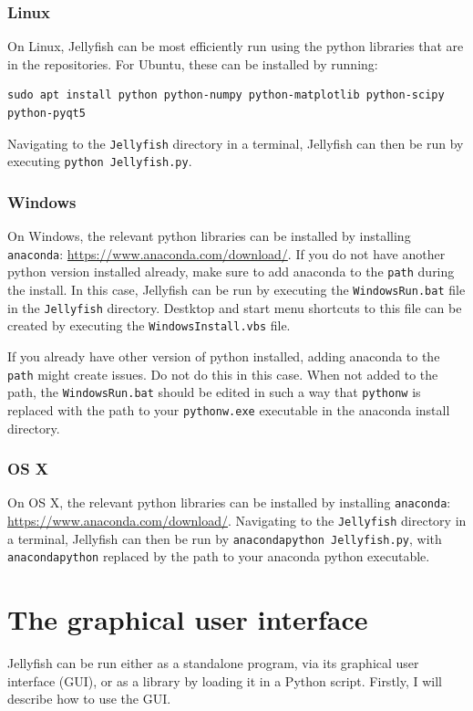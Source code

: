 \documentclass[11pt,a4paper]{article}
\begin{document}
\subsubsection{Linux}
On Linux, Jellyfish can be most efficiently run using the python libraries that are in the
repositories. For Ubuntu, these can be installed by running:
\begin{verbatim}
sudo apt install python python-numpy python-matplotlib python-scipy
python-pyqt5
\end{verbatim}
Navigating to the \texttt{Jellyfish} directory in a terminal, Jellyfish can then be run
by executing \texttt{python Jellyfish.py}.

\subsubsection{Windows}
On Windows, the relevant python libraries can be installed by installing \texttt{anaconda}:
\url{https://www.anaconda.com/download/}. If you do not have another python version installed
already, make sure to add anaconda to the \texttt{path} during the install. In this case, Jellyfish
can be run by executing the \texttt{WindowsRun.bat} file in the \texttt{Jellyfish} directory.
Destktop and start menu shortcuts to this file can be created by executing the
\texttt{WindowsInstall.vbs} file.

If you already have other version of python installed, adding anaconda to the \texttt{path} might
create issues. Do not do this in this case. When not added to the path, the \texttt{WindowsRun.bat}
should be edited in such a way that \texttt{pythonw} is replaced with the path to your
\texttt{pythonw.exe} executable in the anaconda install directory. 

\subsubsection{OS X}
On OS X, the relevant python libraries can be installed by installing \texttt{anaconda}:
\url{https://www.anaconda.com/download/}. Navigating to the \texttt{Jellyfish} directory in a
terminal, Jellyfish can then be run by \texttt{anacondapython Jellyfish.py}, with \texttt{anacondapython}
replaced by the path to your anaconda python executable.

\section{The graphical user interface}
Jellyfish can be run either as a standalone program, via its graphical user interface (GUI), or as a
library by loading it in a Python script. Firstly, I will describe how to use the GUI.
\end{document}
